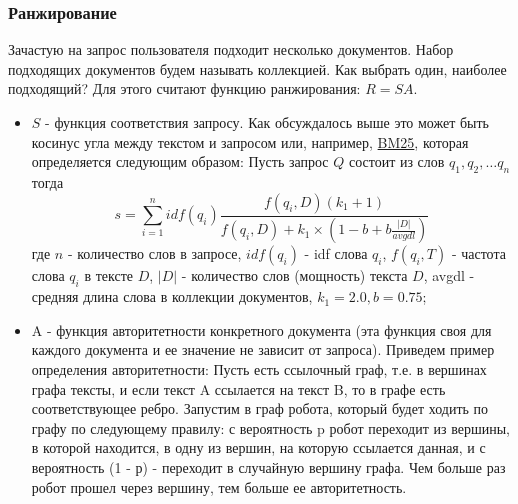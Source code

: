\subsubsection {Ранжирование}
Зачастую на запрос пользователя подходит несколько документов. Набор подходящих документов будем называть коллекцией. Как выбрать один, наиболее подходящий? Для этого считают функцию ранжирования: $R = S A$.
\begin{itemize}
\item $S$ - функция соответствия запросу. Как обсуждалось выше это может быть косинус угла между текстом и запросом или, например, \href{https://clck.ru/pvLYk}{BM25}, которая определяется следующим образом: Пусть запрос $Q$ состоит из слов $q_1, q_2, \dots q_n$ тогда $$ s = \sum_{i = 1}^n idf (q_i)
 \frac {f(q_i, D)(k_1 + 1)}{f(q_i, D) + k_1 \times \left(1 - b + b \frac{|D|}{avgdl} \right)} $$ где $n$ - количество слов в запросе, $idf(q_i)$ - idf слова $q_i$, $f(q_i, T)$ - частота слова $q_i$ в тексте $D$, $|D|$ - количество слов (мощность) текста $D$, avgdl - средняя длина слова в коллекции документов, $k_1 = 2.0, b = 0.75$;
\item A - функция авторитетности конкретного документа (эта функция своя для каждого документа и ее значение не зависит от запроса). Приведем пример определения авторитетности: Пусть есть ссылочный граф, т.е. в вершинах графа тексты, и если текст A ссылается на текст B, то в графе есть соответствующее ребро. Запустим в граф робота, который будет ходить по графу по следующему правилу: с вероятность p робот переходит из вершины, в которой находится, в одну из вершин, на которую ссылается данная, и с вероятность (1 - р) - переходит в случайную вершину графа. Чем больше раз робот прошел через вершину, тем больше ее авторитетность.
\end {itemize}



